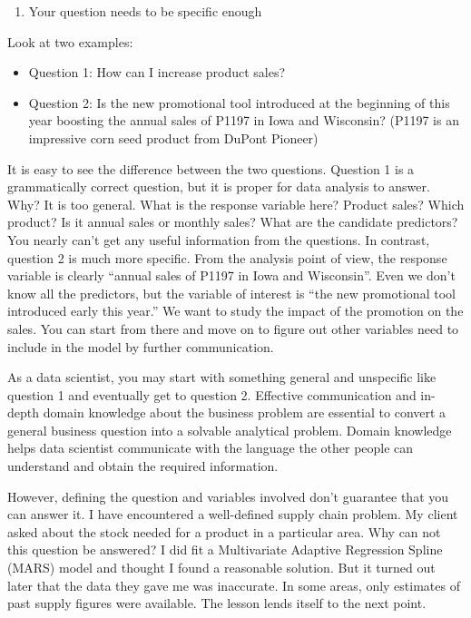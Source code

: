 \documentclass[12pt,]{krantz}
\providecommand{\tightlist}{%
  \setlength{\itemsep}{0pt}\setlength{\parskip}{0pt}}
\theoremstyle{definition}
\theoremstyle{definition}
\theoremstyle{remark}
\begin{document}
\begin{enumerate}
\def\labelenumi{\arabic{enumi}.}
\tightlist
\item
  Your question needs to be specific enough
\end{enumerate}

Look at two examples:

\begin{itemize}
\tightlist
\item
  Question 1: How can I increase product sales?
\item
  Question 2: Is the new promotional tool introduced at the beginning of
  this year boosting the annual sales of P1197 in Iowa and Wisconsin?
  (P1197 is an impressive corn seed product from DuPont Pioneer)
\end{itemize}

It is easy to see the difference between the two questions. Question 1
is a grammatically correct question, but it is proper for data analysis
to answer. Why? It is too general. What is the response variable here?
Product sales? Which product? Is it annual sales or monthly sales? What
are the candidate predictors? You nearly can't get any useful
information from the questions. In contrast, question 2 is much more
specific. From the analysis point of view, the response variable is
clearly ``annual sales of P1197 in Iowa and Wisconsin''. Even we don't
know all the predictors, but the variable of interest is ``the new
promotional tool introduced early this year.'' We want to study the
impact of the promotion on the sales. You can start from there and move
on to figure out other variables need to include in the model by further
communication.

As a data scientist, you may start with something general and unspecific
like question 1 and eventually get to question 2. Effective
communication and in-depth domain knowledge about the business problem
are essential to convert a general business question into a solvable
analytical problem. Domain knowledge helps data scientist communicate
with the language the other people can understand and obtain the
required information.

However, defining the question and variables involved don't guarantee
that you can answer it. I have encountered a well-defined supply chain
problem. My client asked about the stock needed for a product in a
particular area. Why can not this question be answered? I did fit a
Multivariate Adaptive Regression Spline (MARS) model and thought I found
a reasonable solution. But it turned out later that the data they gave
me was inaccurate. In some areas, only estimates of past supply figures
were available. The lesson lends itself to the next point.
\end{document}
